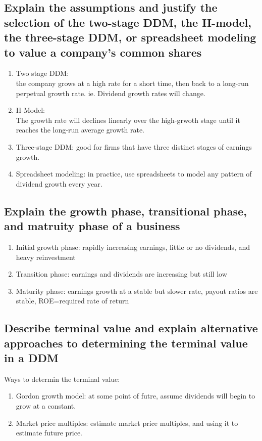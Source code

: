 \documentclass{article}
\newcommand{\be}{\begin{enumerate}}
\newcommand{\ee}{\end{enumerate}}
\begin{document}
\subsection{Explain the assumptions and justify the selection of the two-stage DDM,
the H-model, the three-stage DDM, or spreadsheet modeling to value a company's common
shares}
\be
    \item Two stage DDM:
    \\the company grows at a high rate for a short time, then back to a long-run
        perpetual growth rate. ie. Dividend growth rates will change.
    \item H-Model:
        \\ The growth rate will declines linearly over the high-grwoth stage
        until it reaches the long-run average growth rate.
    \item Three-stage DDM: good for firms that have three distinct stages of earnings growth.
    \item Spreadsheet modeling: in practice, use spreadsheets to model any pattern of dividend
        growth every year.
\ee
\subsection{Explain the growth phase, transitional phase, and matruity phase of a business}
\be
    \item Initial growth phase: rapidly increasing earnings, little or no dividends, and heavy reinvestment
    \item Transition phase: earnings and dividends are increasing but still low
    \item Maturity phase: earnings growth at a stable but slower rate, payout ratios
        are stable, ROE=required rate of return
\ee
\subsection{Describe terminal value and explain alternative approaches to determining
the terminal value in a DDM}
Ways to determin the terminal value:
\be
    \item Gordon growth model: at some point of futre, assume dividends will begin
        to grow at a constant.
    \item Market price multiples: estimate market price multiples, and using it to
        estimate future price.
\ee
\end{document}
